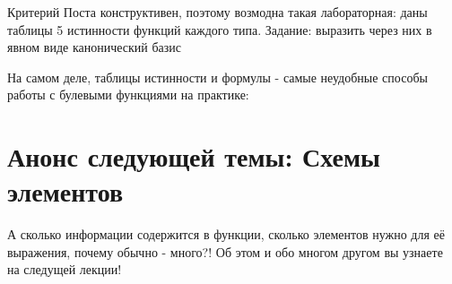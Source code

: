 \documentclass[a4paper, 12pt]{article}
\begin{document}
    \begin{note}
        Критерий Поста конструктивен, поэтому возмодна такая лабораторная: даны таблицы 5 истинности функций каждого типа.
        Задание: выразить через них в явном виде канонический базис    
    \end{note}
    
    \begin{note}
        На самом деле, таблицы истинности и формулы - самые неудобные способы работы с булевыми функциями на практике: 
    \end{note}


    \section{Анонс следующей темы: Схемы элементов}
    А сколько информации содержится в функции, сколько элементов нужно для её выражения, почему обычно - много?!
    Об этом и обо многом другом вы узнаете на следущей лекции!
\end{document}
